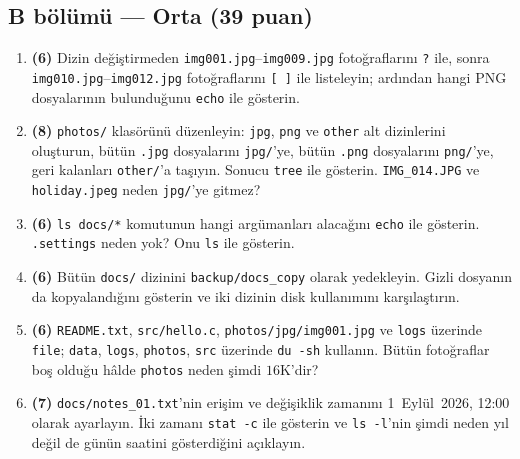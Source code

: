 \documentclass[11pt,a4paper]{article}
\newcommand{\cmd}[1]{\texttt{#1}}
\begin{document}
\subsection*{B bölümü --- Orta (39 puan)}
\begin{enumerate}[leftmargin=2.2em,label=\textbf{\arabic*.},start=8]
  \item \textbf{(6)} Dizin değiştirmeden \texttt{img001.jpg}--\texttt{img009.jpg} fotoğraflarını \texttt{?} ile, sonra \texttt{img010.jpg}--\texttt{img012.jpg} fotoğraflarını \texttt{[\,]} ile listeleyin; ardından hangi PNG dosyalarının bulunduğunu \cmd{echo} ile gösterin.
  \item \textbf{(8)} \texttt{photos/} klasörünü düzenleyin: \texttt{jpg}, \texttt{png} ve \texttt{other} alt dizinlerini oluşturun, bütün \texttt{.jpg} dosyalarını \texttt{jpg/}'ye, bütün \texttt{.png} dosyalarını \texttt{png/}'ye, geri kalanları \texttt{other/}'a taşıyın. Sonucu \cmd{tree} ile gösterin. \texttt{IMG\_014.JPG} ve \texttt{holiday.jpeg} neden \texttt{jpg/}'ye gitmez?
  \item \textbf{(6)} \cmd{ls docs/*} komutunun hangi argümanları alacağını \cmd{echo} ile gösterin. \texttt{.settings} neden yok? Onu \cmd{ls} ile gösterin.
  \item \textbf{(6)} Bütün \texttt{docs/} dizinini \texttt{backup/docs\_copy} olarak yedekleyin. Gizli dosyanın da kopyalandığını gösterin ve iki dizinin disk kullanımını karşılaştırın.
  \item \textbf{(6)} \texttt{README.txt}, \texttt{src/hello.c}, \texttt{photos/jpg/img001.jpg} ve \texttt{logs} üzerinde \cmd{file}; \texttt{data}, \texttt{logs}, \texttt{photos}, \texttt{src} üzerinde \cmd{du -sh} kullanın. Bütün fotoğraflar boş olduğu hâlde \texttt{photos} neden şimdi $16$K'dir?
  \item \textbf{(7)} \texttt{docs/notes\_01.txt}'nin erişim ve değişiklik zamanını 1~Eylül~2026, 12:00 olarak ayarlayın. İki zamanı \cmd{stat -c} ile gösterin ve \cmd{ls -l}'nin şimdi neden yıl değil de günün saatini gösterdiğini açıklayın.
\end{enumerate}
\end{document}
